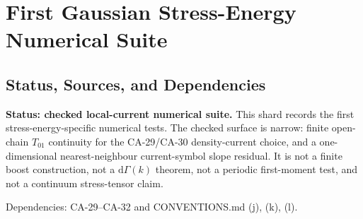 
\section{First Gaussian Stress-Energy Numerical Suite}
\label{sec:gaussian-stress-numerical-suite}

\subsection{Status, Sources, and Dependencies}

\textbf{Status: checked local-current numerical suite.}  This shard records the
first stress-energy-specific numerical tests.  The checked surface is narrow:
finite open-chain \(T_{01}\) continuity for the CA-29/CA-30 density-current
choice, and a one-dimensional nearest-neighbour current-symbol slope residual.
It is not a finite boost construction, not a \(\mathrm d\Gamma(k)\) theorem, not
a periodic first-moment test, and not a continuum stress-tensor claim.

Dependencies: CA-29--CA-32 and CONVENTIONS.md (j), (k), (l).


